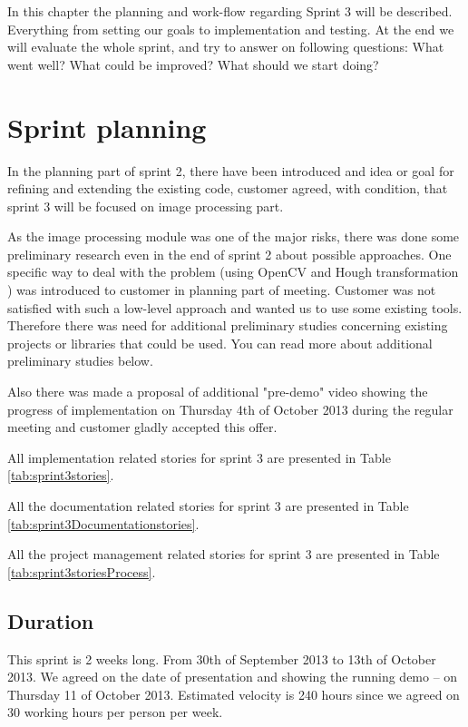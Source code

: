 In this chapter the planning and work-flow regarding Sprint 3 will be described. 
Everything from setting our goals to implementation and testing. At the end we will evaluate the whole sprint, and try to answer on following questions: What went well? What could be improved? What should we start doing?  

\section{Sprint planning}
In the planning part of sprint 2, there have been introduced and idea or goal for refining and extending the existing code, customer agreed, with condition, that sprint 3 will be focused on image processing part.

As the image processing module was one of the major risks, there was done some preliminary research even in the end of sprint 2 about possible approaches.
One specific way to deal with the problem (using OpenCV and Hough transformation \cite{Duda:1972:UHT:361237.361242}) was introduced to customer in planning part of meeting.
Customer was not satisfied with such a low-level approach and wanted us to use some existing tools.
Therefore there was need for additional preliminary studies concerning existing projects or libraries that could be used.
You can read more about additional preliminary studies below.

Also there was made a proposal of additional "pre-demo" video showing the progress of implementation on Thursday 4th of October 2013 during the regular meeting and customer gladly accepted this offer.

All implementation related stories for sprint 3 are presented in Table \ref{tab:sprint3stories}.

All the documentation related stories for sprint 3 are presented in Table \ref{tab:sprint3Documentationstories}.

All the project management related stories for sprint 3 are presented in Table \ref{tab:sprint3storiesProcess}.

\subsection{Duration}
This sprint is 2 weeks long. From 30th of September 2013 to 13th of October 2013.
We agreed on the date of presentation and showing the running demo -- on Thursday 11 of October 2013.
Estimated velocity is 240 hours since we agreed on 30 working hours per person per week.

